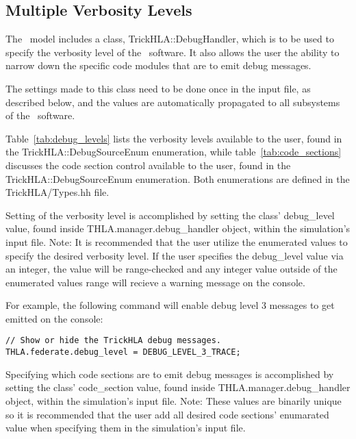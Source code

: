 \subsection{Multiple Verbosity Levels}

The \TrickHLA\ model includes a class, {\ttfamily TrickHLA::DebugHandler},
which is to be used to specify the verbosity level of the \TrickHLA\ software.
It also allows the user the ability to narrow down the specific code modules
that are to emit debug messages.

The settings made to this class need to be done once in the input file, as
described below, and the values are automatically propagated to all subsystems
of the \TrickHLA\ software.

Table~\ref{tab:debug_levels} lists the verbosity levels available to the user,
found in the {\ttfamily TrickHLA::DebugSourceEnum} enumeration, while
table~\ref{tab:code_sections} discusses the code
section control available to the user, found in the {\ttfamily TrickHLA::DebugSourceEnum}
enumeration. Both enumerations are defined in the {\ttfamily TrickHLA/Types.hh}
file.

Setting of the verbosity level is accomplished by setting the class' 
{\ttfamily debug\_level} value, found inside
{\ttfamily THLA.manager.debug\_handler} object, within the simulation's input
file. Note: It is recommended that the user utilize the enumerated values to
specify the desired verbosity level. If the user specifies the
{\ttfamily debug\_level} value via an integer, the value will be range-checked
and any integer value outside of the enumerated values range will recieve a
warning message on the console.

For example, the following command will enable debug level 3 messages to get
emitted on the console:

\begin{verbatim}
// Show or hide the TrickHLA debug messages.
THLA.federate.debug_level = DEBUG_LEVEL_3_TRACE;
\end{verbatim}


Specifying which code sections are to emit debug messages is accomplished by
setting the class' {\ttfamily code\_section} value, found inside
{\ttfamily THLA.manager.debug\_handler} object, within the simulation's input
file. Note: These values are binarily unique so it is recommended that the user
add all desired code sections' enumarated value when specifying them in the
simulation's input file.

